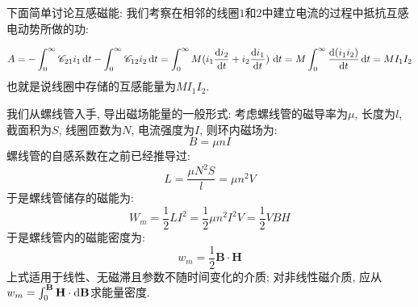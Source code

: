 下面简单讨论互感磁能: 我们考察在相邻的线圈$1$和$2$中建立电流的过程中抵抗互感电动势所做的功:

\[
A = -\int_0^{\infty}\mathscr C_{21}i_1\d t-\int_0^{\infty}\mathscr C_{12}i_2\d t =\int_0^{\infty} M(i_1\frac{\d i_2}{\d t}+i_2\frac{\d i_1}{\d t})\,\d t=M\int_0^{\infty}\frac{\d(i_1i_2)}{\d t} \d t = MI_1I_2
\]
也就是说线圈中存储的互感能量为$MI_1I_2$.

我们从螺线管入手, 导出磁场能量的一般形式: 考虑螺线管的磁导率为$\mu$, 长度为$l$, 截面积为$S$, 线圈匝数为$N$, 电流强度为$I$, 则环内磁场为:
\[
B  =\mu nI
\]
螺线管的自感系数在之前已经推导过:
\[
L = \frac{\mu N^2S}{l} = \mu n^2 V
\]
于是螺线管储存的磁能为:
\[
W_m = \frac{1}{2}LI^2 = \frac{1}{2}\mu n^2 I^2 V = \frac{1}{2}VBH
\]
于是螺线管内的磁能密度为:
\[
w_m = \frac{1}{2}\mathbf{B}\cdot \mathbf{H}
\]
上式适用于线性、无磁滞且参数不随时间变化的介质; 对非线性磁介质, 应从$w_m=\int_0^{\mathbf B}\mathbf H\cdot\mathop{}\!\mathrm{d}\mathbf B$求能量密度.

